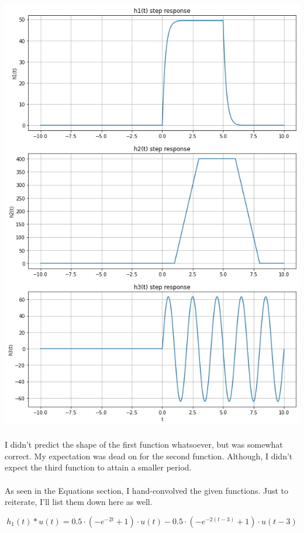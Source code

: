 \documentclass[12pt]{report}
\begin{document}
    \includegraphics[scale=0.6]{h1-3 funct response.png}
    
    \paragraph{} I didn't predict the shape of the first function whatsoever, but was somewhat correct. My expectation was dead on for the second function. Although, I didn't expect the third function to attain a smaller period. 
    
    \paragraph{} As seen in the Equations section, I hand-convolved the given functions. Just to reiterate, I'll list them down here as well. 
    
    \begin{equation*}
        h_1(t) * u(t) = 0.5 \cdot (-e^{-2t} + 1) \cdot u(t) - 0.5 \cdot (-e^{-2(t-3)}+1) \cdot u(t-3)
    \end{equation*}
    
\end{document}
